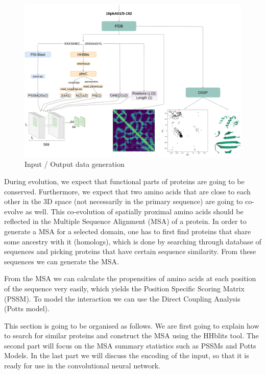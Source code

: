 \begin{figure}
    \centering
    \includegraphics[width=\linewidth]{imgs_tomas/pipeline_input.png}
    \caption{Input / Output data generation}
    \label{fig:pipeline_input}
\end{figure}

During evolution, we expect that functional parts of proteins are going to be conserved. 
Furthermore, we expect that two amino acids that are close to each other in the 3D space (not necessarily in the primary sequence) are going to co-evolve as well. 
This co-evolution of spatially proximal amino acids should be reflected in the Multiple Sequence Alignment (MSA) of a protein. 
In order to generate a MSA for a selected domain, one has to first find proteins that share some ancestry with it (homologs), which is done by searching through database of sequences and picking proteins that have certain sequence similarity. 
From these sequences we can generate the MSA.
    
From the MSA we can calculate the propensities of amino acids at each position of the sequence very easily, which yields the Position Specific Scoring Matrix (PSSM). 
To model the interaction we can use the Direct Coupling Analysis (Potts model).
    
This section is going to be organised as follows. 
We are first going to explain how to search for similar proteins and construct the MSA using the HHblits tool. 
The second part will focus on the MSA summary statistics such as PSSMs and Potts Models. 
In the last part we will discuss the encoding of the input, so that it is ready for use in the convolutional neural network.
    
